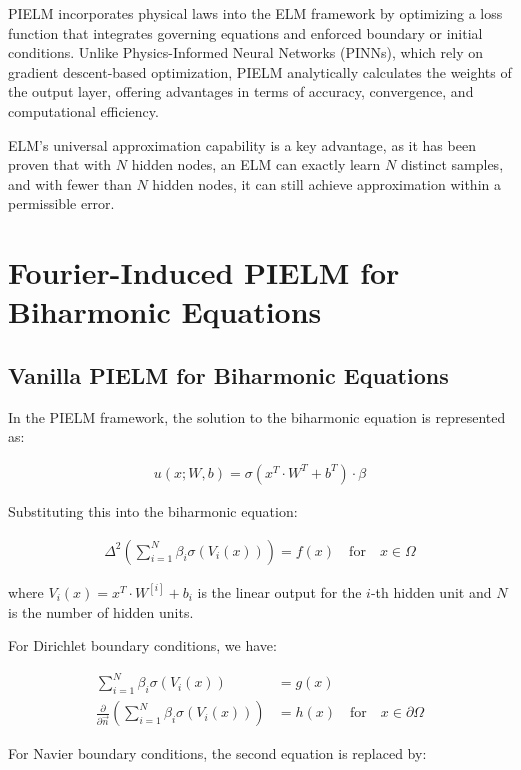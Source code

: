 \documentclass[11pt]{article}
\begin{document}
PIELM incorporates physical laws into the ELM framework by optimizing a loss function that integrates governing equations and enforced boundary or initial conditions. Unlike Physics-Informed Neural Networks (PINNs), which rely on gradient descent-based optimization, PIELM analytically calculates the weights of the output layer, offering advantages in terms of accuracy, convergence, and computational efficiency.

ELM's universal approximation capability is a key advantage, as it has been proven that with $N$ hidden nodes, an ELM can exactly learn $N$ distinct samples, and with fewer than $N$ hidden nodes, it can still achieve approximation within a permissible error.

\section{Fourier-Induced PIELM for Biharmonic Equations}

\subsection{Vanilla PIELM for Biharmonic Equations}

In the PIELM framework, the solution to the biharmonic equation is represented as:

\begin{align}
    u(x; W, b) = \sigma(x^T \cdot W^T + b^T) \cdot \beta
\end{align}

Substituting this into the biharmonic equation:

\begin{align}
    \Delta^2 \left(\sum_{i=1}^{N} \beta_i \sigma(V_i(x))\right) = f(x) \quad \text{for} \quad x \in \Omega
\end{align}

where $V_i(x) = x^T \cdot W^{[i]} + b_i$ is the linear output for the $i$-th hidden unit and $N$ is the number of hidden units.

For Dirichlet boundary conditions, we have:

\begin{align}
    \sum_{i=1}^{N} \beta_i \sigma(V_i(x)) &= g(x) \\
    \frac{\partial}{\partial \vec{n}} \left(\sum_{i=1}^{N} \beta_i \sigma(V_i(x))\right) &= h(x) \quad \text{for} \quad x \in \partial\Omega
\end{align}

For Navier boundary conditions, the second equation is replaced by:
\end{document}
